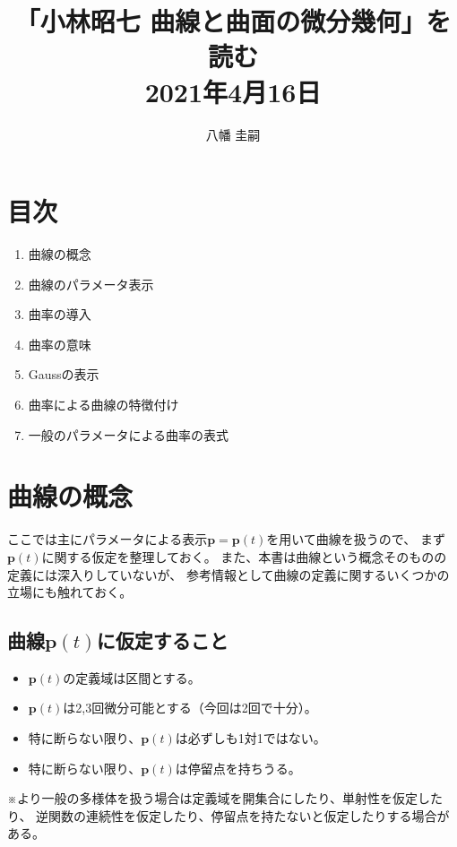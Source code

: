 \documentclass[a4j,disablejfam,dvipdfmx,papersize,slide,uplatex,21pt]{jsarticle}
\begin{document}
\title{「小林昭七 曲線と曲面の微分幾何」を読む\\
2021年4月16日}
\author{八幡 圭嗣}
\date{}
\maketitle

\section*{目次}
\begin{enumerate}
    \item 曲線の概念
    \item 曲線のパラメータ表示
    \item 曲率の導入
    \item 曲率の意味
    \item Gaussの表示
    \item 曲率による曲線の特徴付け
    \item 一般のパラメータによる曲率の表式
\end{enumerate}



\section{曲線の概念}
ここでは主にパラメータによる表示$\bm{p} = \bm{p}(t)$を用いて曲線を扱うので、
まず$\bm{p}(t)$に関する仮定を整理しておく。
また、本書は曲線という概念そのものの定義には深入りしていないが、
参考情報として曲線の定義に関するいくつかの立場にも触れておく。

\newpage
\subsection*{曲線$\bm{p}(t)$に仮定すること}
\begin{itemize}
    \item $\bm{p}(t)$の定義域は区間とする。
    \item $\bm{p}(t)$は2,3回微分可能とする（今回は2回で十分）。
    \item 特に断らない限り、$\bm{p}(t)$は必ずしも1対1ではない。
    \item 特に断らない限り、$\bm{p}(t)$は停留点を持ちうる。
\end{itemize}

\vspace{1em}
※より一般の多様体を扱う場合は定義域を開集合にしたり、単射性を仮定したり、
逆関数の連続性を仮定したり、停留点を持たないと仮定したりする場合がある\cite{kaiseki2}\cite{manifold}。
\end{document}
